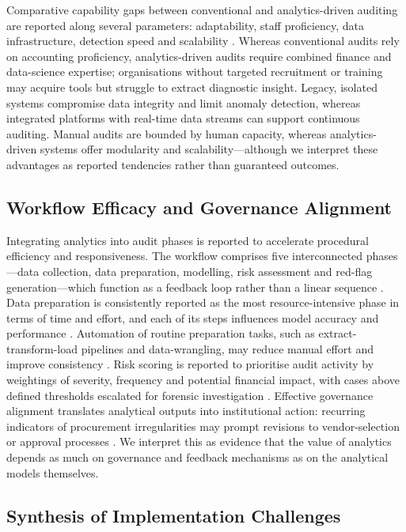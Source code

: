 \documentclass[conference]{IEEEtran}
\begin{document}
Comparative capability gaps between conventional and analytics-driven auditing are reported along several parameters: adaptability, staff proficiency, data infrastructure, detection speed and scalability \cite{b54,b55,b56,b57}. Whereas conventional audits rely on accounting proficiency, analytics-driven audits require combined finance and data-science expertise; organisations without targeted recruitment or training may acquire tools but struggle to extract diagnostic insight. Legacy, isolated systems compromise data integrity and limit anomaly detection, whereas integrated platforms with real-time data streams can support continuous auditing. Manual audits are bounded by human capacity, whereas analytics-driven systems offer modularity and scalability---although we interpret these advantages as reported tendencies rather than guaranteed outcomes.

\subsection{Workflow Efficacy and Governance Alignment}

Integrating analytics into audit phases is reported to accelerate procedural efficiency and responsiveness. The workflow comprises five interconnected phases---data collection, data preparation, modelling, risk assessment and red-flag generation---which function as a feedback loop rather than a linear sequence \cite{b58}. Data preparation is consistently reported as the most resource-intensive phase in terms of time and effort, and each of its steps influences model accuracy and performance \cite{b59}. Automation of routine preparation tasks, such as extract-transform-load pipelines and data-wrangling, may reduce manual effort and improve consistency \cite{b60}. Risk scoring is reported to prioritise audit activity by weightings of severity, frequency and potential financial impact, with cases above defined thresholds escalated for forensic investigation \cite{b61}. Effective governance alignment translates analytical outputs into institutional action: recurring indicators of procurement irregularities may prompt revisions to vendor-selection or approval processes \cite{b62,b63}. We interpret this as evidence that the value of analytics depends as much on governance and feedback mechanisms as on the analytical models themselves.

\subsection{Synthesis of Implementation Challenges}
\end{document}
